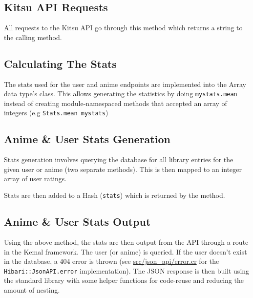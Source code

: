 \captionsetup{type=figure}


\newpage
\subsection{Kitsu API Requests}

All requests to the Kitsu API go through this method which returns a string to the calling method.

\captionsetup{type=figure}


\newpage
\subsection{Calculating The Stats}

The stats used for the user and anime endpoints are implemented into the Array data type's class. This allows generating the statistics by doing \texttt{mystats.mean} instead of creating module-namespaced methods that accepted an array of integers (e.g \texttt{Stats.mean mystats})

\captionsetup{type=figure}


\newpage
\subsection{Anime \& User Stats Generation}

Stats generation involves querying the database for all library entries for the given user or anime (two separate methods). This is then mapped to an integer array of user ratings.

Stats are then added to a Hash (\texttt{stats}) which is returned by the method.

\captionsetup{type=figure}


\newpage
\subsection{Anime \& User Stats Output}

Using the above method, the stats are then output from the API through a route in the Kemal framework. The user (or anime) is queried. If the user doesn't exist in the database, a 404 error is thrown (see \url{src/json_api/error.cr} for the \texttt{Hibari::JsonAPI.error} implementation). The JSON response is then built using the standard library with some helper functions for code-reuse and reducing the amount of nesting.

